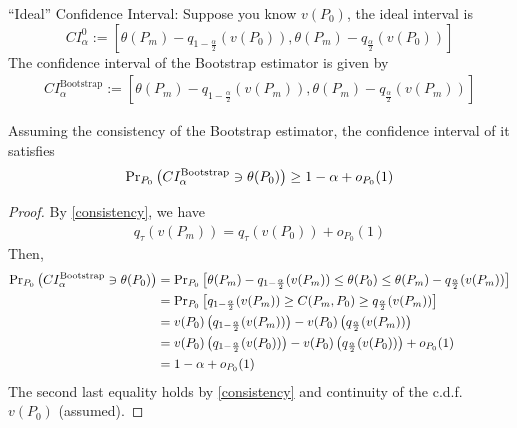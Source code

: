 \documentclass[11pt]{elegantbook}
\begin{document}
``Ideal'' Confidence Interval: Suppose you know $v(P_0)$, the ideal interval is $$CI^0_\alpha:=\left[\theta(P_m)-q_{1-\frac{\alpha}{2}}(v(P_0)),\theta(P_m)-q_{\frac{\alpha}{2}}(v(P_0))\right]$$
The confidence interval of the Bootstrap estimator is given by
\begin{equation}
    \begin{aligned}
        CI^\text{Bootstrap}_\alpha:=\left[\theta(P_m)-q_{1-\frac{\alpha}{2}}(v(P_m)),\theta(P_m)-q_{\frac{\alpha}{2}}(v(P_m))\right]
    \end{aligned}
    \nonumber
\end{equation}
\begin{theorem}
    Assuming the consistency of the Bootstrap estimator, the confidence interval of it satisfies
    \begin{equation}
        \begin{aligned}
            \textnormal{Pr}_{P_0}\left(CI^\text{Bootstrap}_\alpha\ni \theta(P_0)\right)\geq 1-\alpha+o_{P_0}(1)
        \end{aligned}
        \nonumber
    \end{equation}
\end{theorem}
\begin{proof}
    By \eqref{consistency}, we have
    \begin{equation}
        \begin{aligned}
            q_\tau(v(P_m))=q_\tau(v(P_0))+o_{P_0}(1)
        \end{aligned}
        \nonumber
    \end{equation}
    Then,
    \begin{equation}
        \begin{aligned}
            \textnormal{Pr}_{P_0}\left(CI^\text{Bootstrap}_\alpha\ni \theta(P_0)\right)&=\text{Pr}_{P_0}\left[\theta(P_m)-q_{1-\frac{\alpha}{2}}(v(P_m))\leq\theta(P_0)\leq\theta(P_m)-q_{\frac{\alpha}{2}}(v(P_m))\right]\\
            &=\text{Pr}_{P_0}\left[q_{1-\frac{\alpha}{2}}(v(P_m))\geq C(P_m,P_0)\geq q_{\frac{\alpha}{2}}(v(P_m))\right]\\
            &=v(P_0)\left(q_{1-\frac{\alpha}{2}}(v(P_m))\right)-v(P_0)\left(q_{\frac{\alpha}{2}}(v(P_m))\right)\\
            &=v(P_0)\left(q_{1-\frac{\alpha}{2}}(v(P_0))\right)-v(P_0)\left(q_{\frac{\alpha}{2}}(v(P_0))\right)+o_{P_0}(1)\\
            &=1-\alpha+o_{P_0}(1)
        \end{aligned}
        \nonumber
    \end{equation}
    The second last equality holds by \eqref{consistency} and continuity of the c.d.f. $v(P_0)$ (assumed).
\end{proof}
\end{document}
